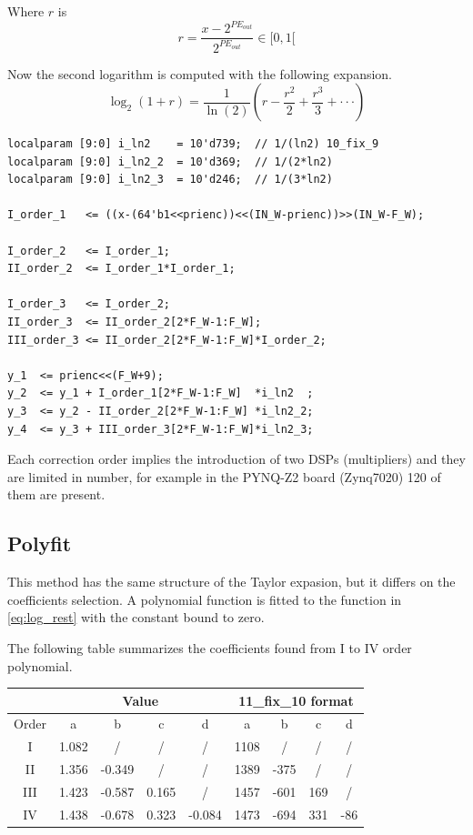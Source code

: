 \documentclass[12pt]{article}
\begin{document}
Where $r$ is
\begin{equation}
    r=\frac{x-2^{PE_{out}}}{2^{PE_{out}}}\in[0,1[
\end{equation}

Now the second logarithm is computed with the following expansion.
\begin{equation}
    \label{eq:log_rest}
    \log_2\left(1+r\right)=\frac{1}{\ln(2)}\left(r-\frac{r^2}{2}+\frac{r^3}{3}+ \cdot \cdot \cdot \right)
\end{equation}

\begin{lstlisting}[style={verilog-style}]
localparam [9:0] i_ln2    = 10'd739;  // 1/(ln2) 10_fix_9
localparam [9:0] i_ln2_2  = 10'd369;  // 1/(2*ln2)
localparam [9:0] i_ln2_3  = 10'd246;  // 1/(3*ln2)

I_order_1   <= ((x-(64'b1<<prienc))<<(IN_W-prienc))>>(IN_W-F_W);
                    
I_order_2   <= I_order_1;
II_order_2  <= I_order_1*I_order_1;
                    
I_order_3   <= I_order_2;
II_order_3  <= II_order_2[2*F_W-1:F_W];
III_order_3 <= II_order_2[2*F_W-1:F_W]*I_order_2;

y_1  <= prienc<<(F_W+9);
y_2  <= y_1 + I_order_1[2*F_W-1:F_W]  *i_ln2  ;
y_3  <= y_2 - II_order_2[2*F_W-1:F_W] *i_ln2_2;
y_4  <= y_3 + III_order_3[2*F_W-1:F_W]*i_ln2_3;

\end{lstlisting}


Each correction order implies the introduction of two DSPs (multipliers) and they are limited in number, for example in the PYNQ-Z2 board (Zynq7020) 120 of them are present.

\subsection{Polyfit}
This method has the same structure of the Taylor expasion, but it differs on the coefficients selection. A polynomial function is fitted to the function in \eqref{eq:log_rest} with the constant bound to zero.  

The following table summarizes the coefficients found from I to IV order polynomial.
\begin{table}[h]
\begin{tabular}{c|cccc|cccc}
&\multicolumn{4}{c|}{Value}  &\multicolumn{4}{c}{11\_fix\_10 format}         \\ \hline 
Order   & a     & b      & c        & d     & a     & b     & c     & d     \\ \hline
I       & 1.082 & /      & /        & /     & 1108  & /     & /     & /     \\
II      & 1.356 & -0.349 & /        & /     & 1389  & -375  & /     & /     \\
III     & 1.423 & -0.587 & 0.165    & /     & 1457  & -601  & 169   & /     \\
IV      & 1.438 & -0.678 & 0.323    & -0.084& 1473  & -694  & 331   & -86   \\

\end{tabular}
\end{table}
\end{document}
